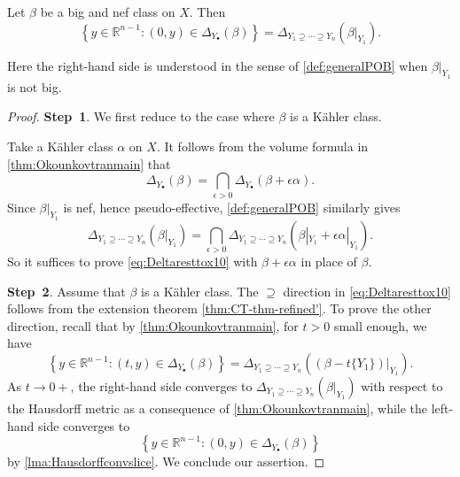 \begin{lemma}\label{lma:Kahlerclassokounrest}
    Let $\beta$ be a big and nef class on $X$. Then
    \begin{equation}\label{eq:Deltaresttox10}
    \left\{ y\in \mathbb{R}^{n-1}: (0,y)\in \Delta_{Y_{\bullet}}(\beta)\right\}=\Delta_{Y_1\supseteq \cdots \supseteq Y_n}(\beta|_{Y_1}).
    \end{equation}
\end{lemma}
Here the right-hand side is understood in the sense of \cref{def:generalPOB} when $\beta|_{Y_1}$ is not big.
\begin{proof}
    \textbf{Step~1}. We first reduce to the case where $\beta$ is a Kähler class.

    Take a Kähler class $\alpha$ on $X$. It follows from the volume formula in \cref{thm:Okounkovtranmain} that
    \[
        \Delta_{Y_{\bullet}}(\beta)=\bigcap_{\epsilon>0}\Delta_{Y_{\bullet}}(\beta+\epsilon\alpha).
    \]
    Since $\beta|_{Y_1}$ is nef, hence pseudo-effective, \cref{def:generalPOB} similarly gives
    \[
        \Delta_{Y_1\supseteq \cdots \supseteq Y_n}(\beta|_{Y_1})= \bigcap_{\epsilon>0}\Delta_{Y_1\supseteq \cdots \supseteq Y_n}(\beta|_{Y_1}+\epsilon \alpha|_{Y_1}).
    \]
    So it suffices to prove \eqref{eq:Deltaresttox10} with $\beta+\epsilon\alpha$ in place of $\beta$.

    \textbf{Step~2}. Assume that $\beta$ is a Kähler class.
    The $\supseteq$ direction in \eqref{eq:Deltaresttox10} follows from the extension theorem \cref{thm:CT-thm-refined'}. To prove the other direction, recall that by \cref{thm:Okounkovtranmain}, for $t>0$ small enough, we have
    \[
    \left\{ y\in \mathbb{R}^{n-1}: (t,y)\in \Delta_{Y_{\bullet}}(\beta) \right\}=\Delta_{Y_1\supseteq \cdots \supseteq Y_n}\left((\beta-t\{Y_1\})|_{Y_1}\right).
    \]
    As $t\to 0+$, the right-hand side converges to $\Delta_{Y_1\supseteq \cdots \supseteq Y_n}(\beta|_{Y_1})$ with respect to the Hausdorff metric as a consequence of \cref{thm:Okounkovtranmain}, while the left-hand side converges to
    \[
    \left\{ y\in \mathbb{R}^{n-1}: (0,y)\in \Delta_{Y_{\bullet}}(\beta) \right\}
    \]
    by \cref{lma:Hausdorffconvslice}. We conclude our assertion.
\end{proof}

